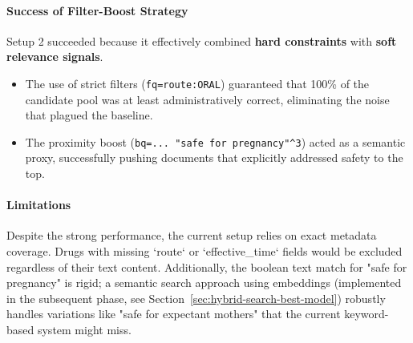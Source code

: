 \paragraph{Success of Filter-Boost Strategy}
Setup 2 succeeded because it effectively combined \textbf{hard constraints} with \textbf{soft relevance signals}.
\begin{itemize}
    \item The use of strict filters (\texttt{fq=route:ORAL}) guaranteed that 100\% of the candidate pool was at least administratively correct, eliminating the noise that plagued the baseline.
    \item The proximity boost (\texttt{bq=... "safe for pregnancy"\^{}3}) acted as a semantic proxy, successfully pushing documents that explicitly addressed safety to the top.
\end{itemize}

\paragraph{Limitations}
Despite the strong performance, the current setup relies on exact metadata coverage. Drugs with missing `route` or `effective\_time` fields would be excluded regardless of their text content. Additionally, the boolean text match for "safe for pregnancy" is rigid; a semantic search approach using embeddings (implemented in the subsequent phase, see Section~\ref{sec:hybrid-search-best-model}) robustly handles variations like "safe for expectant mothers" that the current keyword-based system might miss.
